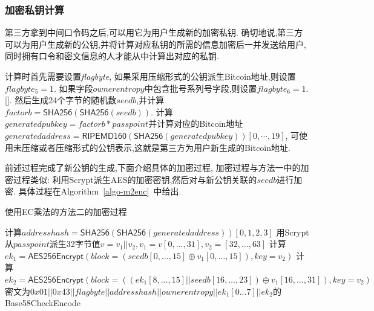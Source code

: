 \subsubsection{加密私钥计算}
第三方拿到中间口令码之后,可以用它为用户生成新的加密私钥.
确切地说,第三方可以为用户生成新的公钥,并将计算对应私钥的所需的信息加密后一并发送给用户,
同时拥有口令和密文信息的人才能从中计算出对应的私钥.  

计算时首先需要设置\textit{flagbyte}, 如果采用压缩形式的公钥派生Bitcoin地址,则设置$flagbyte_5=1$.
如果字段$ownerentropy$中包含批号系列号字段,则设置$flagbyte_6=1$.[].
然后生成24个字节的随机数$seedb$,并计算$factorb=\textsf{SHA256}(\textsf{SHA256}(seedb))$.
计算$generatedpubkey = factorb * passpoint$并计算对应的Bitcoin地址
$generatedaddress=\textsf{RIPEMD160}(\textsf{SHA256}(generatedpubkey))[0,\cdots,19]$,
可使用未压缩或者压缩形式的公钥表示,这就是第三方为用户新生成的Bitcoin地址.



前述过程完成了新公钥的生成,下面介绍具体的加密过程,
加密过程与方法一中的加密过程类似:
利用Scrypt派生AES的加密密钥,然后对与新公钥关联的$seedb$进行加密.
具体过程在Algorithm~\ref{algo-m2enc}~中给出.

\begin{algorithm}[h]\footnotesize
\caption{使用EC乘法的方法二的加密过程}\label{algo-m2enc}
  	\begin{algorithmic}[1]
	   	\STATE 计算$addresshash=\textsf{SHA256}(\textsf{SHA256}(generatedaddress))[0,1,2,3]$ 
	    	\STATE 用Scrypt从$passpoint$派生32字节值$v=v_1||v_2, v_1 = v[0,\dots, 31], v_2= [32,\dots,63]$
	    	\STATE 计算$ek_1 = \textsf{AES256Encrypt}(block = (seedb[0,\dots,15] \oplus v_1[0,\dots,15]), key = v_2)$
		\STATE 计算$ek_2 = \textsf{AES256Encrypt}(block = ((ek_1[8,\dots,15] || seedb[16,\dots,23])  \oplus v_1[16,\dots,31]), key = v_2)$
		\STATE 密文为$0x01 || 0x43 || flagbyte || addresshash || ownerentropy ||  ek_1[0...7] || ek_2$的 \textsf{Base58CheckEncode}
    \end{algorithmic}
\end{algorithm}

